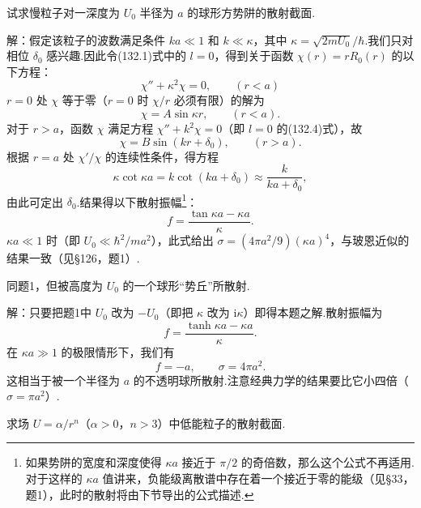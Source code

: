 \begin{xiti}

\quad 试求慢粒子对一深度为 $U_0$ 半径为 $a$ 的球形方势阱的散射截面.

解：假定该粒子的波数满足条件 $ka\ll1$ 和 $k\ll\kappa$，其中
$\kappa=\sqrt{2mU_0}/\hbar$.我们只对相位 $\delta_0$ 感兴趣.因此令(132.1)式中的 $l=0$，得到关于函数 $\chi(r)=rR_0(r)$ 的以下方程：
\begin{equation*}
  \chi''+\kappa^2\chi=0,\qquad(r<a)
\end{equation*}
$r=0$ 处 $\chi$ 等于零（$r=0$ 时 $\chi/r$ 必须有限）的解为
\begin{equation*}
  \chi=A\sin\kappa r,\qquad(r<a).
\end{equation*}
对于 $r>a$，函数 $\chi$ 满足方程 $\chi''+k^2\chi=0$（即 $l=0$ 的(132.4)式），故
\begin{equation*}
  \chi=B\sin(kr+\delta_0),\qquad(r>a).
\end{equation*}
根据 $r=a$ 处 $\chi'/\chi$ 的连续性条件，得方程
\begin{equation*}
  \kappa\cot\kappa a=k\cot(ka+\delta_0)
  \approx\frac{k}{ka+\delta_0},
\end{equation*}
由此可定出 $\delta_0$.结果得以下散射振幅\footnote{如果势阱的宽度和深度使得 $\kappa a$ 接近于 $\pi/2$ 的奇倍数，那么这个公式不再适用.对于这样的 $\kappa a$ 值讲来，负能级离散谱中存在着一个接近于零的能级（见§33，题1），此时的散射将由下节导出的公式描述.}：
\begin{equation*}
  f=\frac{\tan\kappa a-\kappa a}{\kappa}.
\end{equation*}
$\kappa a\ll1$ 时（即 $U_0\ll\hbar^2/ma^2$），此式给出
$\sigma=(4\pi a^2/9)(\kappa a)^4$，与玻恩近似的结果一致（见§126，题1）.

\quad 同题1，但被高度为 $U_0$ 的一个球形“势丘”所散射.

解：只要把题1中 $U_0$ 改为 $-U_0$（即把 $\kappa$ 改为 $\mathrm{i}\kappa$）即得本题之解.散射振幅为
\begin{equation*}
  f=\frac{\tanh\kappa a-\kappa a}{\kappa}.
\end{equation*}
在 $\kappa a\gg1$ 的极限情形下，我们有
\begin{equation*}
  f=-a,\qquad\sigma=4\pi a^2.
\end{equation*}
这相当于被一个半径为 $a$ 的不透明球所散射.注意经典力学的结果要比它小四倍（$\sigma=\pi a^2$）.

\quad 求场 $U=\alpha/r^n$（$\alpha>0$，$n>3$）中低能粒子的散射截面.


\end{xiti}
